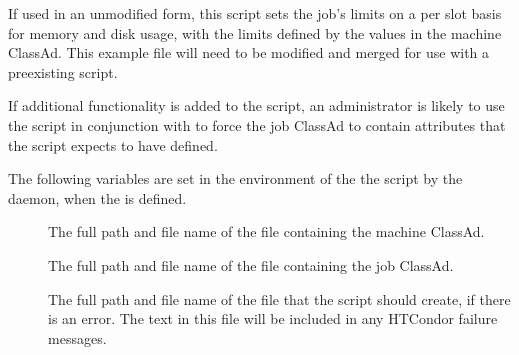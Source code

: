If used in an unmodified form,
this script sets the job's limits on a per slot basis for
memory and disk usage,
with the limits defined by the values in the machine ClassAd.
This example file will need to be modified and merged for use with a
preexisting  script.

If additional functionality is added to the script,
an administrator is likely to use the  script
in conjunction with  to force the job ClassAd
to contain attributes that the  script
expects to have defined.

The following variables are set in the environment of the
the  script by the 
daemon, when the  is defined.
\begin{description}
\item[
]
  The full path and file name of the file containing the machine ClassAd.
\item[
]
  The full path and file name of the file containing the job ClassAd.
\item[
]
  The full path and file name of the file that the 
  script should create, if there is an error.
  The text in this file will be included in any HTCondor failure messages. 
\end{description}
